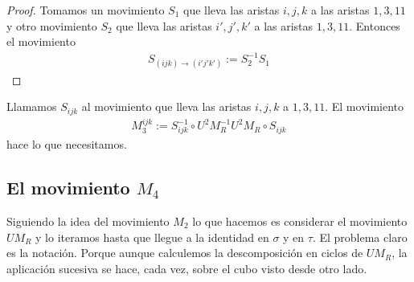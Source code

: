 \documentclass{article}
\theoremstyle{definition}
\begin{document}
\begin{proof}
    Tomamos un movimiento $S_1$ que lleva las aristas $i,j,k$ a las aristas $1,3,11$ y otro movimiento $S_2$ que lleva las aristas $i',j',k'$ a las aristas $1,3,11$. Entonces el movimiento
    \begin{align*}
        S_{(ijk)\to (i'j'k')}:=S_2^{-1}S_1
    \end{align*}
\end{proof}
Llamamos $S_{ijk}$ al movimiento que lleva las aristas $i,j,k$ a $1,3,11$. El movimiento
\begin{align*}
    M^{ijk}_3:=S_{ijk}^{-1}\circ U^2M_R^{-1}U^2M_R\circ S_{ijk}
\end{align*}
hace lo que necesitamos.
\subsection[M4]{El movimiento $M_4$}
Siguiendo la idea del movimiento $M_2$ lo que hacemos es considerar el movimiento $UM_R$ y lo iteramos hasta que llegue a la identidad en $\sigma$ y en $\tau$. El problema claro es la notación. Porque aunque calculemos la descomposición en ciclos de $UM_R$, la aplicación sucesiva se hace, cada vez, sobre el cubo visto desde otro lado.
\end{document}
